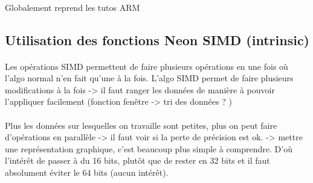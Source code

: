 \documentclass{article}
\begin{document}
    \paragraph{}
    Globalement reprend les tutos ARM

    \subsection{Utilisation des fonctions Neon SIMD (intrinsic)}

    \paragraph{}
    Les opérations SIMD permettent de faire plusieurs opérations en une fois où l'algo normal n'en fait qu'une à la fois. L'algo SIMD permet de faire plusieurs modifications à la fois -> il faut ranger les données de manière à pouvoir l'appliquer facilement (fonction fenêtre -> tri des données ? )


    \paragraph{}
    Plus les données sur lesquelles on travaille sont petites, plus on peut faire d'opérations en parallèle -> il faut voir si la perte de précision est ok. -> mettre une représentation graphique, c'est beaucoup plus simple à comprendre. D'où l'intérêt de passer à du 16 bits, plutôt que de rester en 32 bits et il faut absolument éviter le 64 bits (aucun intérêt).
\end{document}
